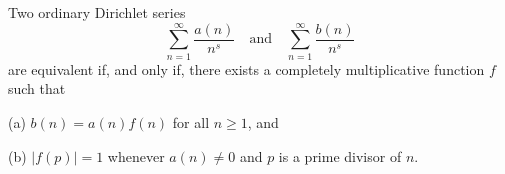 Two ordinary Dirichlet series
$$\sum_{n=1}^{\infty} \frac{a(n)}{n^s} \quad \text{and} \quad \sum_{n=1}^{\infty} \frac{b(n)}{n^s}$$
are equivalent if, and only if, there exists a completely multiplicative function $f$ such that

(a) $b(n) = a(n)f(n)$ for all $n \geq 1$, and

(b) $|f(p)| = 1$ whenever $a(n) \neq 0$ and $p$ is a prime divisor of $n$.
